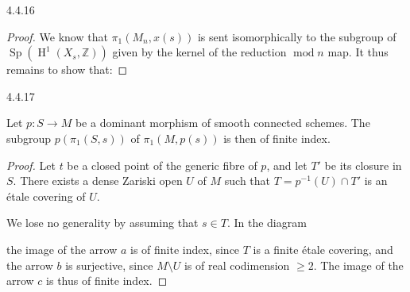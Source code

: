 \begin{lemma}{4.4.16}
\begin{proof}
      We know that \(\pi _1(M_n,x(s))\) is sent isomorphically to the subgroup of \(\operatorname {Sp}(\operatorname {H}^1(X_s,\mathbb {Z}))\) given by the kernel of the reduction \(\operatorname {mod}{n}\) map.
      It thus remains to show that:\end{proof}\end{lemma}\begin{lemma}{4.4.17}\label{hodge-theory-ii-4.4.17}\skipsinglepar\par{}Let \(p\colon  S\to  M\) be a dominant morphism of smooth connected schemes.
    The subgroup \(p(\pi _1(S,s))\) of \(\pi _1(M,p(s))\) is then of finite index.\begin{proof}\par{}Let \(t\) be a closed point of the generic fibre of \(p\), and let \(T'\) be its closure in \(S\).
      There exists a dense Zariski open \(U\) of \(M\) such that \(T=p^{-1}(U)\cap  T'\) is an étale covering of \(U\).\par{}We lose no generality by assuming that \(s\in  T\).
      In the diagram
      

      the image of the arrow \(a\) is of finite index, since \(T\) is a finite étale covering, and the arrow \(b\) is surjective, since \(M\setminus  U\) is of real codimension \(\geqslant 2\).
      The image of the arrow \(c\) is thus of finite index.\end{proof}\end{lemma}